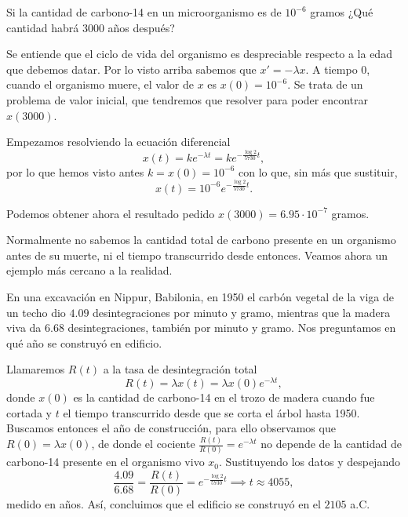 \documentclass[../ecuaciones_diferenciales.tex]{subfiles}
\begin{document}
\begin{example}
	Si la cantidad de carbono-14 en un microorganismo es de \(10^{-6}\) gramos
	¿Qué cantidad habrá 3000 años después?
\end{example}

\begin{solution}
	Se entiende que el ciclo de vida del organismo es despreciable respecto a la
	edad que debemos datar. Por lo visto arriba sabemos que \(x' = -\lambda x\).
	A tiempo \(0\), cuando el organismo muere, el valor de \(x\) es
	\(x(0) = 10^{-6}\). Se trata de un problema de valor inicial, que tendremos
	que resolver para poder encontrar \(x(3000)\).

	Empezamos resolviendo la ecuación diferencial
	\[x(t) = k e^{-\lambda t} = k e^{-\frac{\log 2}{5730} t},\]
	por lo que hemos visto antes \(k = x(0) = 10^{-6}\) con lo que, sin más que
	sustituir,
	\[x(t) = 10^{-6} e^{-\frac{\log 2}{5730} t}.\]

	Podemos obtener ahora el resultado pedido
	\(x(3000) = 6.95 \cdot 10^{-7}\) gramos.
\end{solution}

Normalmente no sabemos la cantidad total de carbono presente en un organismo
antes de su muerte, ni el tiempo transcurrido desde entonces. Veamos ahora un
ejemplo más cercano a la realidad.

\begin{example}
	En una excavación en Nippur, Babilonia, en 1950 el carbón vegetal de la viga
	de un techo dio \(4.09\) desintegraciones por minuto y gramo, mientras que
	la madera viva da \(6.68\) desintegraciones, también por minuto y gramo.
	Nos preguntamos en qué año se construyó en edificio.
\end{example}

\begin{solution}
	Llamaremos \(R(t)\) a la tasa de desintegración total
	\[R(t) = \lambda x(t) = \lambda x(0) e^{-\lambda t},\]
	donde \(x(0)\) es la
	cantidad de carbono-14 en el trozo de madera cuando fue cortada y \(t\) el
	tiempo transcurrido desde que se corta el árbol hasta 1950. Buscamos entonces
	el año de construcción, para ello observamos que \(R(0) = \lambda x(0)\), de
	donde el cociente \(\frac{R(t)}{R(0)} = e^{-\lambda t}\) no depende de la
	cantidad de carbono-14 presente en el organismo vivo \(x_0\). Sustituyendo
	los datos y despejando
	\[\frac{4.09}{6.68} = \frac{R(t)}{R(0)} = e^{-\frac{\log 2}{5730} t}
		\implies t \approx 4055,\]
	medido en años. Así, concluimos que el edificio se construyó en el \(2105\)
	a.C.
\end{solution}
\end{document}
